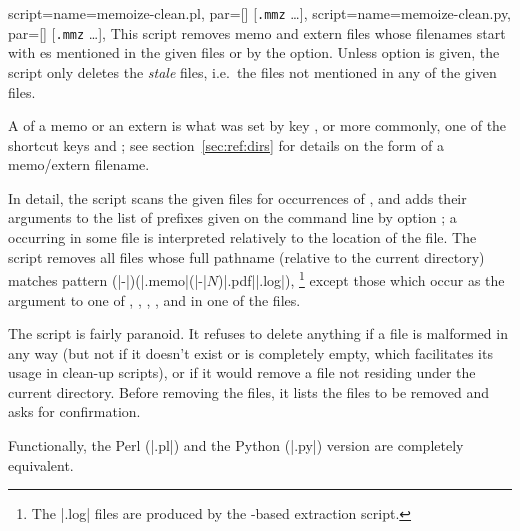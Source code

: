 \documentclass[a4paper,11pt]{article}
\begin{document}
\begin{doc}{
    script={name=memoize-clean.pl, par=[] [\texttt{.mmz} \dots]},
    script={name=memoize-clean.py, par=[] [\texttt{.mmz} \dots]},
  }
  This script removes memo and extern files whose filenames start with
  es mentioned in the given \dmmz files or by the
   option.  Unless option
   is given, the script only deletes the
  \emph{stale} files, i.e.\ the files not mentioned in any of the given \dmmz
  files.

  A  of a memo or an extern is what was set by key
  , or more commonly, one of the shortcut keys 
  and ; see section~\ref{sec:ref:dirs} for details on the
  form of a memo/extern filename.

  In detail, the script scans the given \dmmz files for occurrences of
  , and adds their  arguments to the list of
  prefixes given on the command line by option
  ; a  occurring in some \dmmz
  file is interpreted relatively to the location of the \dmmz file.  The script
  removes all files whose full pathname (relative to the current directory)
  matches pattern
  (|-|)(|.memo|\alt(|-|$N$)|.pdf|\alt|.log|),%
  \footnote{The |.log| files are produced by the -based extraction
    script.}  except those which occur as the  argument to one
  of , , ,
  ,  and  in one
  of the \dmmz files.

  The script is fairly paranoid.  It refuses to delete anything if a \dmmz file
  is malformed in any way (but not if it doesn't exist or is completely empty,
  which facilitates its usage in clean-up scripts), or if it would remove a
  file not residing under the current directory.  Before removing the files, it
  lists the files to be removed and asks for confirmation.

  Functionally, the Perl (|.pl|) and the Python (|.py|) version are completely
  equivalent.
  

\end{doc}
\end{document}
